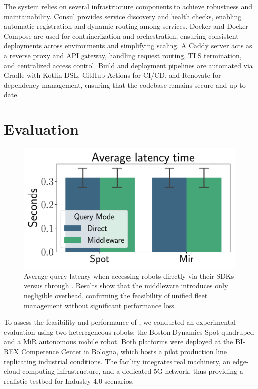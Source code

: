 \documentclass[conference]{IEEEtran}
\begin{document}
The system relies on several infrastructure components to achieve robustness and maintainability. 
%
Consul provides service discovery and health checks, 
 enabling automatic registration and dynamic routing among services. 
% 
Docker and Docker Compose are used for containerization and orchestration, 
 ensuring consistent deployments across environments and simplifying scaling. 
% 
A Caddy server acts as a reverse proxy and API gateway, 
 handling request routing, TLS termination, and centralized access control. 
% 
Build and deployment pipelines are automated via Gradle with Kotlin DSL, GitHub Actions for CI/CD, 
 and Renovate for dependency management, ensuring that the codebase remains secure and up to date.


\section{Evaluation}\label{sec:eval}

\begin{figure}[htb]
    \centering
    \includegraphics[width=0.6\columnwidth]{images/latency.pdf}
    \caption{
        Average query latency when accessing robots directly via their SDKs versus through \approach{}. 
        Results show that the middleware introduces only negligible overhead, 
        confirming the feasibility of unified fleet management without significant performance loss.
    }
    \label{fig:latency}
\end{figure}

To assess the feasibility and performance of \approach{}, 
 we conducted an experimental evaluation using two heterogeneous robots: 
 the Boston Dynamics Spot quadruped and a MiR autonomous mobile robot. 
% 
Both platforms were deployed at the BI-REX Competence Center in Bologna, 
 which hosts a pilot production line replicating industrial conditions. 
% 
The facility integrates real machinery, an edge-cloud computing infrastructure, 
 and a dedicated 5G network, thus providing a realistic testbed for Industry 4.0 scenarios.
\end{document}
